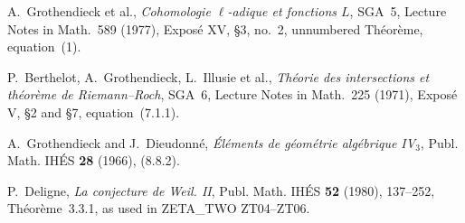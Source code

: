 A.~Grothendieck et al., \emph{Cohomologie $\ell$-adique et
fonctions $L$}, SGA~5, Lecture Notes in Math.~589 (1977),
Expos\'e XV, \S3, no.~2, unnumbered Th\'eor\`eme, equation~(1).

P.~Berthelot, A.~Grothendieck, L.~Illusie et al.,
\emph{Th\'eorie des intersections et th\'eor\`eme de Riemann--Roch},
SGA~6, Lecture Notes in Math.~225 (1971),
Expos\'e V, \S2 and \S7, equation~(7.1.1).

A.~Grothendieck and J.~Dieudonn\'e,
\emph{\'El\'ements de g\'eom\'etrie alg\'ebrique IV$_3$},
Publ. Math. IH\'ES \textbf{28} (1966), (8.8.2).

P.~Deligne, \emph{La conjecture de Weil. II},
Publ. Math. IH\'ES \textbf{52} (1980), 137--252,
Th\'eor\`eme~3.3.1, as used in ZETA\_TWO ZT04--ZT06.
